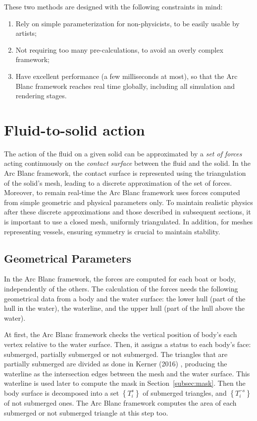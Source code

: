 \documentclass[11pt]{article}
\def\Framework{The Arc Blanc framework\xspace}
\def\framework{the Arc Blanc framework\xspace}
\begin{document}
These two methods are designed with the following constraints in mind:
\begin{enumerate}
	\item \label{enum:simpleParam} Rely on simple parameterization for non-physicists, to be easily usable by artists;
	\item \label{enum:noPrecal} Not requiring too many pre-calculations, to avoid an overly complex framework;
	\item \label{enum:perf} Have excellent performance (a few milliseconds at most), so that \framework reaches real time globally, including all simulation and rendering stages.
\end{enumerate}


\section{Fluid-to-solid action}
\label{sec:fluidToSolidAction}
The action of the fluid on a given solid can be approximated by a \emph{set of forces} acting continuously on the \emph{contact surface} between the fluid and the solid.
In \framework, the contact surface is represented using the triangulation of the solid's mesh, leading to a discrete approximation of the set of forces.
Moreover, to remain real-time \framework uses forces computed from simple geometric and physical parameters only.
To maintain realistic physics after these discrete approximations and those described in subsequent sections, it is important to use a closed mesh, uniformly triangulated. In addition, for meshes representing vessels, ensuring symmetry is crucial to maintain stability.


\subsection{Geometrical Parameters}
\label{subsec:geomParam}
In \framework, the forces are computed for each boat or body, independently of the others.
The calculation of the forces needs the following geometrical data from a body and the water surface:
the lower hull (part of the hull in the water), the waterline, and the upper hull (part of the hull above the water).

At first, \framework checks the vertical position of body's each vertex relative to the water surface.
Then, it assigns a status to each body's face: submerged, partially submerged or not submerged.
The triangles that are partially submerged are divided as done in Kerner (2016) \cite{kernerWaterInteractionModel2016}, producing the waterline as the intersection edges between the mesh and the water surface.
This waterline is used later to compute the mask in Section~\ref{subsec:mask}.
Then the body surface is decomposed into a set $\left\lbrace T_i^s\right\rbrace$ of submerged triangles, and $\left\lbrace T_i^{\neg s}\right\rbrace$ of not submerged ones.
\Framework computes the area of each submerged or not submerged triangle at this step too.
\end{document}
